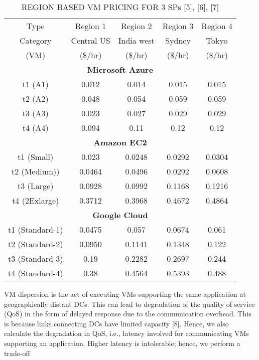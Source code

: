 \documentclass[conference]{IEEEtran}
\newcommand\tab[1][0.8cm]{\hspace*{#1}}
\begin{document}
\begin{table}[htbp!]
	\caption{REGION BASED VM PRICING FOR 3 SPs [5], [6], [7]}
	\begin{center}
		\begin{tabular}{c|c|c|c|c}
			\hline
			Type & Region 1 & Region 2 & Region 3 & Region 4\\
			Category & Central US & India west & Sydney & Tokyo\\
			(VM) & (\$/hr) & (\$/hr) & (\$/hr) & (\$/hr)\\
			\hline
		\multicolumn{5}{c}{	\textbf{Microsoft Azure}}\\
		\hline
		t1 (A1) & 0.012 & 0.014 & 0.015 & 0.015\\
		t2 (A2) & 0.048 & 0.054 & 0.059 & 0.059\\
		t3 (A3) & 0.023 & 0.027 & 0.029 & 0.029\\
		t4 (A4) & 0.094 & 0.11 & 0.12 & 0.12\\
		\hline
		\multicolumn{5}{c}{	\textbf{Amazon EC2}}\\
		\hline
		t1 (Small) & 0.023 & 0.0248 & 0.0292 & 0.0304\\
		t2 (Medium)) & 0.0464 & 0.0496 & 0.0292 & 0.0608\\
		t3 (Large) & 0.0928 & 0.0992 & 0.1168 & 0.1216\\
		t4 (2Exlarge) & 0.3712 & 0.3968 & 0.4672 & 0.4864\\
		\hline
		\multicolumn{5}{c}{	\textbf{Google Cloud}}\\
		\hline
		t1 (Standard-1) & 0.0475 & 0.057 & 0.0674 & 0.061\\
		t2 (Standard-2) & 0.0950 & 0.1141 & 0.1348 & 0.122\\
		t3 (Standard-3) & 0.19 & 0.2282 & 0.2697 & 0.244\\
		t4 (Standard-4) & 0.38 & 0.4564 & 0.5393 & 0.488\\
		\hline
		\end{tabular}
		\label{tab1}
	\end{center}
\end{table}
\newline
\tab VM dispersion is the act of executing VMs supporting the
same application at geographically distant DCs. This can lead
to degradation of the quality of service (QoS) in the form of
delayed response due to the communication overhead. This
is because links connecting DCs have limited capacity [8].
Hence, we also calculate the degradation in QoS, i.e., latency
involved for communicating VMs supporting an application.
Higher latency is intolerable; hence, we perform a trade-off
\end{document}
